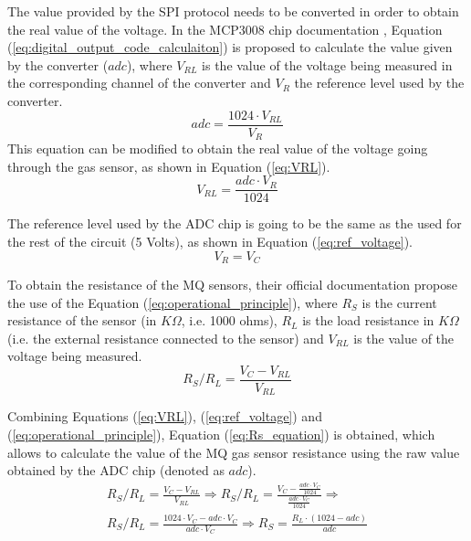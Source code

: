The value provided by the \ac{SPI} protocol needs to be converted in order to obtain the real value of the voltage. In the MCP3008 chip documentation \cite{ADC}, Equation (\ref{eq:digital_output_code_calculaiton}) is proposed to calculate the value given by the converter ($adc$), where ${V}_{RL}$ is the value of the voltage being measured in the corresponding channel of the converter and ${V}_{R}$ the reference level used by the converter.
\begin{equation} \label{eq:digital_output_code_calculaiton}
adc = \frac { 1024\cdot { V }_{ RL } }{ { V }_{ R } } 
\end{equation}
This equation can be modified to obtain the real value of the voltage going through the gas sensor, as shown in Equation (\ref{eq:VRL}).
\begin{equation} \label{eq:VRL}
{ V }_{ RL } =\frac { adc \cdot  { V }_{ R }}{ 1024 }  
\end{equation}

The reference level used by the \ac{ADC} chip is going to be the same as the used for the rest of the circuit (5 Volts), as shown in Equation (\ref{eq:ref_voltage}).
\begin{equation} \label{eq:ref_voltage}
{V}_{R} = {V}_{C}
\end{equation}

To obtain the resistance of the MQ sensors, their official documentation \cite{MQ7,MQ2} propose the use of the Equation (\ref{eq:operational_principle}), where ${R}_{S}$ is the current resistance of the sensor (in $K\Omega$, i.e. 1000 ohms), ${R}_{L}$ is the load resistance in $K\Omega$ (i.e. the external resistance connected to the sensor) and ${V}_{RL}$ is the value of the voltage being measured. 
\begin{equation} \label{eq:operational_principle}
{ { R }_{ S } }/{ { R }_{ L } }=\frac { { V }_{ C }-V_{ RL } }{ V_{ RL } } 
\end{equation}

Combining Equations (\ref{eq:VRL}), (\ref{eq:ref_voltage}) and (\ref{eq:operational_principle}), Equation (\ref{eq:Rs_equation}) is obtained, which allows to calculate the value of the MQ gas sensor resistance using the raw value obtained by the \ac{ADC} chip (denoted as $adc$).
\begin{equation} \label{eq:Rs_equation}
\begin{aligned}
{ { R }_{ S } }/{ { R }_{ L } }=\frac { { V }_{ C }-V_{ RL } }{ V_{ RL } } \Rightarrow 
{ { R }_{ S } }/{ { R }_{ L } }=\frac { { V }_{ C }-\frac { adc\cdot { V }_{ C } }{ 1024 }  }{ \frac { adc\cdot { V }_{ C } }{ 1024 }  } \Rightarrow \\
{ { R }_{ S } }/{ { R }_{ L } }=\frac { 1024\cdot { V }_{ C }-adc\cdot { V }_{ C } }{ adc\cdot { V }_{ C } } \Rightarrow 
\boxed{
{ R }_{ S }=\frac {  { R }_{ L } \cdot (1024-adc) }{ adc } 
}
\end{aligned}
\end{equation}

